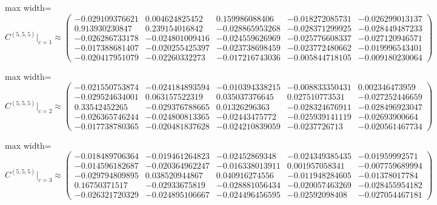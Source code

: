 \begin{center}
\begin{adjustbox}{max width=\linewidth}
\(
C^{(5,5,5)}\big|_{c=1}\approx
\begin{pmatrix}
-0.029109376621 & 0.004624825452 & 0.159986088406 & -0.018272085731 & -0.026299013137\\
0.913930230847 & 0.239154016842 & -0.028865953268 & -0.028371299925 & -0.028449487233\\
-0.026286733178 & -0.024801009416 & -0.024559626969 & -0.025776608337 & -0.027120946571\\
-0.017388681407 & -0.020255425397 & -0.023738698459 & -0.023772480662 & -0.019996543401\\
-0.020417951079 & -0.02260332273 & -0.017216743036 & -0.005844718105 & -0.009180230064
\end{pmatrix}
\)
\end{adjustbox}
\end{center}
\begin{center}
\begin{adjustbox}{max width=\linewidth}
\(
C^{(5,5,5)}\big|_{c=2}\approx
\begin{pmatrix}
-0.021550753874 & -0.024184893594 & -0.010394338215 & -0.008833350431 & 0.002346473959\\
-0.029524634001 & 0.063157522319 & 0.035037376645 & 0.027510773531 & -0.027252446659\\
0.33542452265 & -0.029376788665 & 0.01326296363 & -0.028324676911 & -0.028496923047\\
-0.026365746244 & -0.024800813365 & -0.02443475772 & -0.025939141119 & -0.02693900664\\
-0.017738780365 & -0.020481837628 & -0.024210839059 & -0.0237726713 & -0.020561467734
\end{pmatrix}
\)
\end{adjustbox}
\end{center}
\begin{center}
\begin{adjustbox}{max width=\linewidth}
\(
C^{(5,5,5)}\big|_{c=3}\approx
\begin{pmatrix}
-0.018489706364 & -0.019461264823 & -0.02452869348 & -0.024349385435 & -0.01959992571\\
-0.014596182687 & -0.020364962247 & -0.016338013911 & 0.001957058341 & -0.007759689994\\
-0.029794809895 & 0.038520944867 & 0.040916274556 & -0.011948284605 & -0.01378017784\\
0.16750371517 & -0.02933675819 & -0.028881056434 & -0.020057463269 & -0.028455954182\\
-0.026321720329 & -0.024895106667 & -0.024496456595 & -0.02592098408 & -0.027054467181
\end{pmatrix}
\)
\end{adjustbox}
\end{center}

